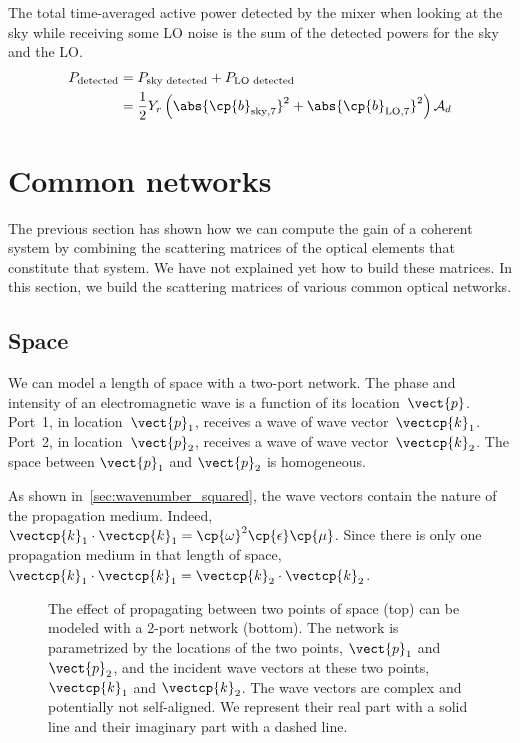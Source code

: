 \begin{refsection}
The total time-averaged active power detected by the mixer when looking at the sky while receiving some LO noise is the sum of the detected powers for the sky and the LO.
\begin{align*}
    P_\text{detected}
    &=
    P_\text{sky detected} + P_\text{LO detected}
    \\
    &= \frac{1}{2}
       Y_r
       \left(
           \abs{\cp{b}_{\text{sky},7}}^2
           +
           \abs{\cp{b}_{\text{LO},7}}^2
       \right)
       \mathcal{A}_d
\end{align*}



\FloatBarrier
\section{Common networks}
The previous section has shown how we can compute the gain of a coherent system by combining the scattering matrices of the optical elements that constitute that system.
We have not explained yet how to build these matrices.
In this section, we build the scattering matrices of various common optical networks.



\subsection{Space}
We can model a length of space with a two-port network.
The phase and intensity of an electromagnetic wave is a function of its location~$\vect{p}$.
Port~1, in location~$\vect{p}_1$, receives a wave of wave vector~$\vectcp{k}_1$.
Port~2, in location~$\vect{p}_2$, receives a wave of wave vector~$\vectcp{k}_2$.
The space between $\vect{p}_1$ and $\vect{p}_2$ is homogeneous.

As shown in~\cref{sec:wavenumber_squared}, the wave vectors contain the nature of the propagation medium.
Indeed, $\vectcp{k}_1\cdot\vectcp{k}_1 = \cp{\omega}^2\cp{\epsilon}\cp{\mu}$.
Since there is only one propagation medium in that length of space,
$\vectcp{k}_1\cdot\vectcp{k}_1 = \vectcp{k}_2\cdot\vectcp{k}_2$.

\begin{figure}
    \centering
    
    \caption{The effect of propagating between two points of space (top) can be modeled with a 2-port network (bottom).
        The network is parametrized by the locations of the two points,
        $\vect{p}_1$ and $\vect{p}_2$,
        and the incident wave vectors at these two points,
        $\vectcp{k}_1$ and $\vectcp{k}_2$.
        The wave vectors are complex and potentially not self-aligned.
        We represent their real part with a solid line and their imaginary part with a dashed line.
    }
    \label{fig:network_distance}
\end{figure}


\end{refsection}
